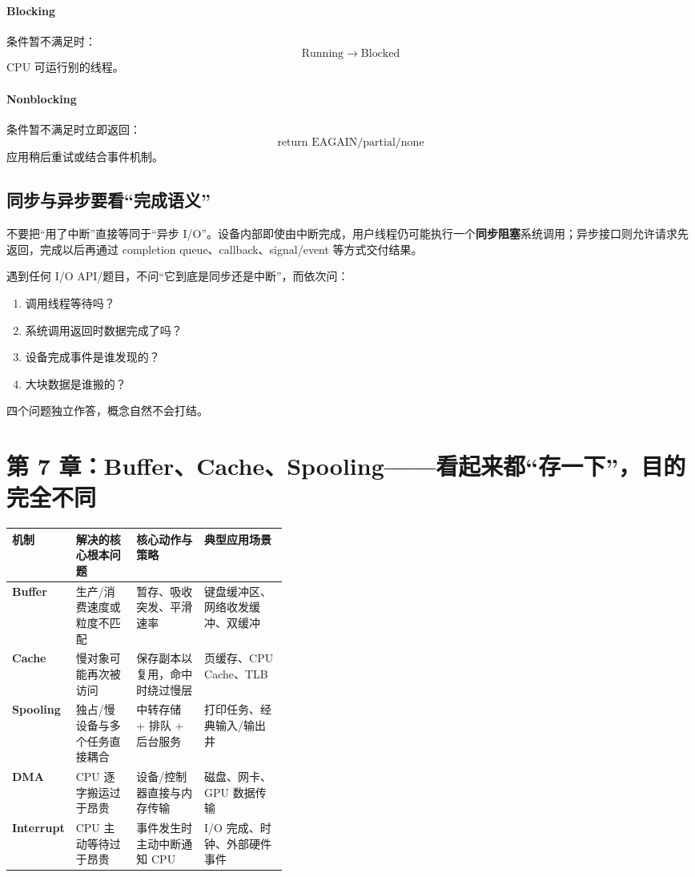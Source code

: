 \documentclass[UTF8,fontset=fandol,11pt,a4paper]{ctexart}
\newcommand{\kw}[1]{\textbf{#1}}
\newcommand{\arr}{\;\longrightarrow\;}
\begin{document}
\paragraph{Blocking}
条件暂不满足时：
\[
\text{Running}\arr\text{Blocked}
\]
CPU 可运行别的线程。

\paragraph{Nonblocking}
条件暂不满足时立即返回：
\[
\text{return EAGAIN/partial/none}
\]
应用稍后重试或结合事件机制。

\subsection{同步与异步要看“完成语义”}
不要把“用了中断”直接等同于“异步 I/O”。设备内部即使由中断完成，用户线程仍可能执行一个\kw{同步阻塞}系统调用；异步接口则允许请求先返回，完成以后再通过 completion queue、callback、signal/event 等方式交付结果。

\begin{method}[四维判断法]
遇到任何 I/O API/题目，不问“它到底是同步还是中断”，而依次问：
\begin{enumerate}
  \item 调用线程等待吗？
  \item 系统调用返回时数据完成了吗？
  \item 设备完成事件是谁发现的？
  \item 大块数据是谁搬的？
\end{enumerate}
四个问题独立作答，概念自然不会打结。
\end{method}

\section{第 7 章：Buffer、Cache、Spooling——看起来都“存一下”，目的完全不同}

\begingroup
\small
\renewcommand{\arraystretch}{1.25}
\setlength{\tabcolsep}{6pt}
\begin{tabularx}{\linewidth}{>{\bfseries}p{0.18\linewidth} p{0.22\linewidth} X X}
\toprule
机制 & 解决的核心根本问题 & 核心动作与策略 & 典型应用场景 \\
\midrule
Buffer & 生产/消费速度或粒度不匹配 & 暂存、吸收突发、平滑速率 & 键盘缓冲区、网络收发缓冲、双缓冲 \\
Cache & 慢对象可能再次被访问 & 保存副本以复用，命中时绕过慢层 & 页缓存、CPU Cache、TLB \\
Spooling & 独占/慢设备与多个任务直接耦合 & 中转存储 + 排队 + 后台服务 & 打印任务、经典输入/输出井 \\
DMA & CPU 逐字搬运过于昂贵 & 设备/控制器直接与内存传输 & 磁盘、网卡、GPU 数据传输 \\
Interrupt & CPU 主动等待过于昂贵 & 事件发生时主动中断通知 CPU & I/O 完成、时钟、外部硬件事件 \\
\bottomrule
\end{tabularx}
\endgroup
\end{document}
